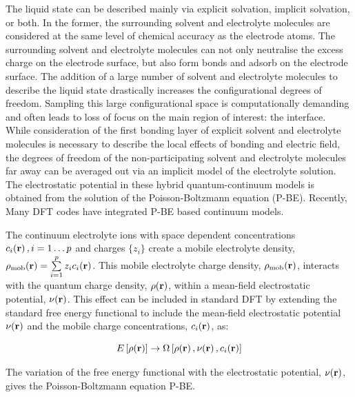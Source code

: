 \documentclass[../main.tex]{subfiles}
\begin{document}
The liquid state can be described mainly via explicit solvation,\cite{Hansen2016} implicit solvation,\cite{Sakong2015} or both.\cite{Skyner2015} In the former, the surrounding solvent and electrolyte molecules are considered at the same level of chemical accuracy as the electrode atoms. The surrounding solvent and electrolyte molecules can not only neutralise the excess charge on the electrode surface, but also form bonds and adsorb on the electrode surface.\cite{Kang2011,Dufils2019, Jorn2013} The addition of a large number of solvent and electrolyte molecules to describe the liquid state drastically increases the configurational degrees of freedom. Sampling this large configurational space is computationally demanding and often leads to loss of focus on the main region of interest: the interface. While consideration of the first bonding layer of explicit solvent and electrolyte molecules is necessary to describe the local effects of bonding and electric field,\cite{Zhang2020} the degrees of freedom of the non-participating solvent and electrolyte molecules far away can be averaged out via an implicit model of the electrolyte solution.\cite{Cramer1999, Tomasi2005} The electrostatic potential in these hybrid quantum-continuum models is obtained from the solution of the Poisson-Boltzmann equation (P-BE).\cite{Grochowski2008} Recently, Many DFT codes have integrated P-BE based continuum models.\cite{Jinnouchi2008, Gunceler2013, Ringe2016, Nattino2019, Melander2019, Stein2019, DLMG2018, Dziedzic2020, neutralization-paper}

The continuum electrolyte ions with space dependent concentrations $c_i\!\left(\mathbf{r}\right), i=1\dots p$ and charges $\{z_i\}$ create a mobile electrolyte density, $\rho_{\textrm{mob}}\!\left(\mathbf{r}\right)=\sum\limits_{i=1}^p z_ic_i\!\left(\mathbf{r}\right)$. This mobile electrolyte charge density, $\rho_{\textrm{mob}}\!\left(\mathbf{r}\right)$,  interacts with the quantum charge density, $\rho\!\left(\mathbf{r}\right)$, within a mean-field electrostatic potential, $\nu\!\left(\mathbf{r}\right)$. This effect can be included in standard DFT by extending the standard free energy functional to include the mean-field electrostatic potential $\nu\!\left(\mathbf{r}\right)$ and the mobile charge concentrations, $c_i\!\left(\mathbf{r}\right)$, as:\cite{Dziedzic2020}

\begin{equation}
    E\left[\rho\!\left(\mathbf{r}\right)\right]\rightarrow \Omega\left[\rho\!\left(\mathbf{r}\right),\nu\!\left(\mathbf{r}\right),c_i\!\left(\mathbf{r}\right)\right]
\end{equation}

The variation of the free energy functional with the electrostatic potential, $\nu\!\left(\mathbf{r}\right)$, gives the Poisson-Boltzmann equation P-BE.
\end{document}
